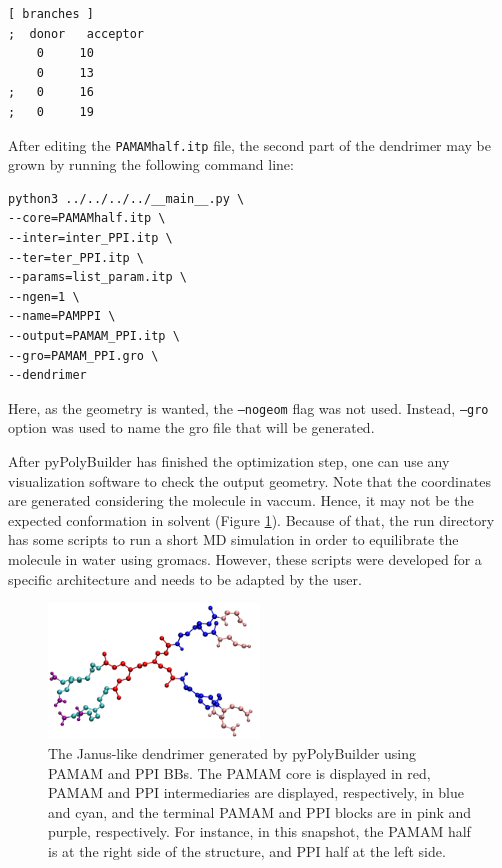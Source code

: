 \begin{lstlisting}
[ branches ]
;  donor   acceptor
    0     10
    0     13
;   0     16
;   0     19
\end{lstlisting}

After editing the \texttt{PAMAMhalf.itp} file, the second part of the dendrimer may be grown by running the following command line:

\begin{lstlisting}
python3 ../../../../__main__.py \
--core=PAMAMhalf.itp \
--inter=inter_PPI.itp \
--ter=ter_PPI.itp \
--params=list_param.itp \
--ngen=1 \
--name=PAMPPI \
--output=PAMAM_PPI.itp \
--gro=PAMAM_PPI.gro \
--dendrimer
\end{lstlisting}

Here, as the geometry is wanted, the \texttt{--nogeom} flag was not used.
Instead, \texttt{--gro} option was used to name the gro file that will be generated.

After pyPolyBuilder has finished the optimization step, one can use any visualization software to check the output geometry. 
Note that the coordinates are generated considering the molecule in vaccum.
Hence, it may not be the expected conformation in solvent (Figure \ref{fig:JanusPPB}).
Because of that, the run directory has some scripts to run a short MD simulation in order to equilibrate the molecule in water using gromacs.
However, these scripts were developed for a specific architecture and needs to be adapted by the user.

\begin{figure}
    \centering
    \includegraphics[width=0.5\textwidth]{PAMAM_PPI-Janus/PAMAM_PPI.pdf}
    \caption{The Janus-like dendrimer generated by pyPolyBuilder using PAMAM and PPI BBs. The PAMAM core is displayed in red, PAMAM and PPI intermediaries are displayed, respectively, in blue and cyan, and the terminal PAMAM and PPI blocks are in pink and purple, respectively.
    For instance, in this snapshot, the PAMAM half is at the right side of the structure, and PPI half at the left side.}
    \label{fig:JanusPPB}
\end{figure}

